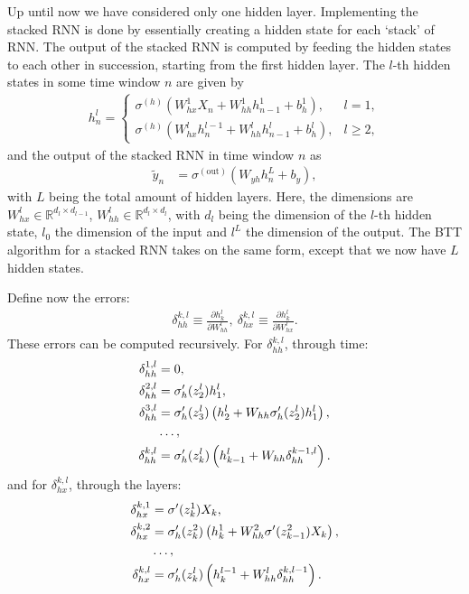 \documentclass[%
reprint,
amsmath,amssymb,
aps,
]{revtex4-2}
\begin{document}
Up until now we have considered only one hidden layer. Implementing the stacked RNN is done by essentially creating a hidden state for each `stack' of RNN. The output of the stacked RNN is computed by feeding the hidden states to each other in succession, starting from the first hidden layer. The \(l\)-th hidden states in some time window \(n\) are given by
\begin{align}
	h^{l}_{n} = \begin{cases}
		\sigma^{(h)}\left( W_{hx}^{1}X_{n} + W_{hh}^{1}h_{n-1}^{1} + b_{h}^{1}\right), &l=1, \\
		\sigma^{(h)}\left( W_{hx}^{l}h_{n}^{l-1} + W_{hh}^{l}h_{n-1}^{l} + b_{h}^{l}\right), &l\geq 2,
	\end{cases}
\end{align}	
and the output of the stacked RNN in time window \(n\) as
\begin{align}
	\tilde{y}_{n} &= \sigma^{(\text{out})}\left( W_{yh}h^{L}_{n} + b_{y} \right),
\end{align}
with \(L\) being the total amount of hidden layers. 
Here, the dimensions are \(W^{l}_{hx}\in\mathbb{R}^{d_{l}\times d_{l-1}}\), \(W^{l}_{hh}\in\mathbb{R}^{d_{l}\times d_{l}}\), with \(d_l\) being the dimension of the \(l\)-th hidden state, \(l_0\) the dimension of the input and \(l^{L}\) the dimension of the output. The BTT algorithm for a stacked RNN takes on the same form, except that we now have \(L\) hidden states. 


Define now the errors:
\begin{align}
	\delta^{k,l}_{hh}\equiv \frac{\partial h_{k}^{l}}{\partial W_{hh}^{l}}, \ \delta^{k,l}_{hx}\equiv \frac{\partial h_{k}^{l}}{\partial W_{hx}^{l}}.
\end{align}
These errors can be computed recursively. For \(\delta^{k,l}_{hh}\), through time:
\begin{align}
	\delta^{1,l}_{hh} &= 0, \notag\\
	\delta^{2,l}_{hh} &= \sigma'_{h}(z_2^{l}) h_1^{l},  \notag\\
	\delta^{3,l}_{hh} &= \sigma'_{h}(z_3^{l}) \left( h_2^{l} + W_{hh}\sigma'_{h}(z_2^{l})h_1^{l} \right), \\
	&\dots, \notag \\
	\delta^{k,l}_{hh} &= \sigma'_{h}(z_{k}^{l}) \left( h_{k-1}^{l} + W_{hh}\delta^{k-1,l}_{hh}\right).
\end{align}
and for \(\delta^{k,l}_{hx}\), through the layers:
\begin{align}
	\delta^{k,1}_{hx} &= \sigma'(z_{k}^{1})X_{k}, \notag\\
	\delta^{k,2}_{hx} &= \sigma'_{h}(z_{k}^{2}) \left( h_{k}^{1} + W^{2}_{hh}\sigma'(z_{k-1}^{2})X_{k} \right),  \notag\\
	&\dots, \notag \\
	\delta^{k,l}_{hx} &= \sigma'_{h}(z_{k}^{l}) \left( h_{k}^{l-1} + W_{hh}^{l}\delta^{k,l-1}_{hh}\right).
\end{align}
\end{document}
